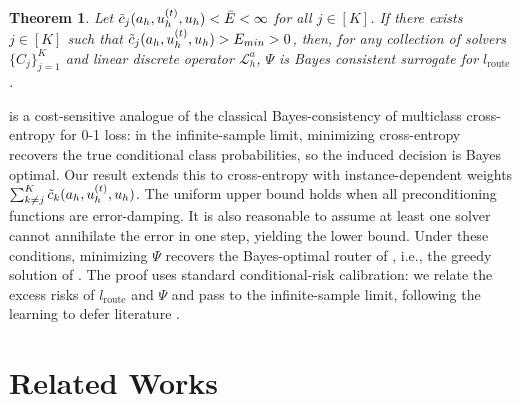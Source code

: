 \documentclass{article} %
\newtheorem{theorem}{Theorem}[section]
\newcommand\ambuj[1]{\textcolor{red}{AT: #1}}
\begin{document}
\begin{theorem} \label{th:consistency}
    Let $\Tilde{c}_j(a_h, u^{(t)}_h, u_h) < \Bar{E} < \infty$  for all $j \in [K]$. If there exists $j\in [K]$ such that $\Tilde{c}_j(a_h, u^{(t)}_h, u_h) > E_{min} > 0$, then, for any collection of solvers $\{C_j\}_{j= 1}^K$ and linear discrete operator $\mathcal{L}_h^a$, $\Psi$ is Bayes consistent surrogate for $l_{\text{route}}$.
\end{theorem}
 is a cost-sensitive analogue of the classical Bayes-consistency of multiclass cross-entropy for 0-1 loss: in the infinite-sample limit, minimizing cross-entropy recovers the true conditional class probabilities, so the induced decision is Bayes optimal. Our result extends this to cross-entropy with instance-dependent weights $\sum_{k \neq j}^K\Tilde{c}_k(a_h, u^{(t)}_h, u_h)$. The uniform upper bound holds when all preconditioning functions are error-damping. It is also reasonable to assume at least one solver cannot annihilate the error in one step, yielding the lower bound. Under these conditions, minimizing $\Psi$ recovers the Bayes-optimal router of , i.e., the greedy solution of . The proof uses standard conditional-risk calibration: we relate the excess risks of $l_{\text{route}}$ and $\Psi$ and pass to the infinite-sample limit, following the learning to defer literature \citep{mao2024regression}.



\section{Related Works}
\end{document}
